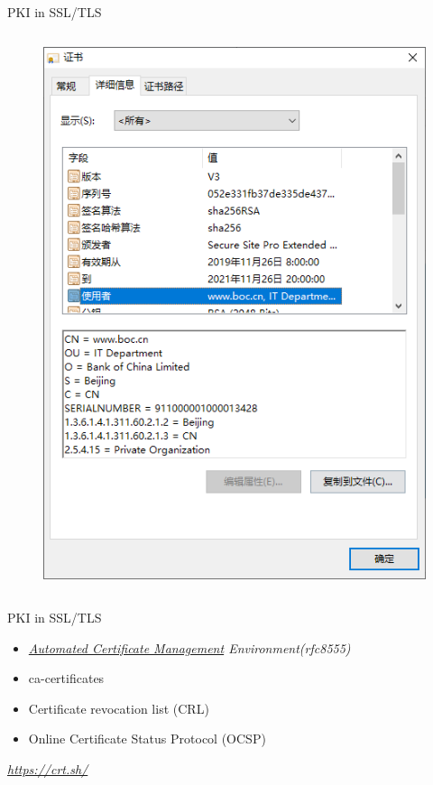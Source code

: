 \documentclass[UTF8]{ctexbeamer}
\begin{document}
\begin{frame}{PKI in SSL/TLS}
\begin{columns}
\begin{column}{0.25\textwidth}
\begin{figure}
            \end{figure}
            \begin{figure}
                \centering
                \includegraphics[width=\textwidth]{ev-2.png}
            \end{figure}
        \end{column}
    \end{columns}
\end{frame}

\begin{frame}{PKI in SSL/TLS}
    \begin{itemize}
        \item \textit{\href{https://datatracker.ietf.org/doc/html/rfc8555}{Automated Certificate Management} Environment(rfc8555)}
        \item ca-certificates
        \item Certificate revocation list (CRL)
        \item Online Certificate Status Protocol (OCSP)
    \end{itemize}
    
    \vspace{2em}
    
    \centering
    \textit{\url{https://crt.sh/}}
\end{frame}
\end{document}
